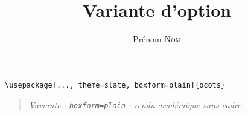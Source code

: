 \documentclass[11pt]{ocots-book}
\title{Variante d'option}
\author{Prénom \textsc{Nom}}
\newcommand{\ocotsvariantnote}[1]{\begin{quote}\itshape Variante : #1\end{quote}}
\begin{document}
\maketitle
\begin{lstlisting}
\usepackage[..., theme=slate, boxform=plain]{ocots}
\end{lstlisting}
\ocotsvariantnote{\texttt{boxform=plain} : rendu académique sans cadre.}

\end{document}
